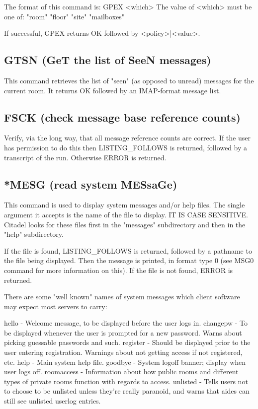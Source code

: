  The format of this command is:  GPEX <which>
 The value of <which> must be one of: "room" "floor" "site" "mailboxes"

 If successful, GPEX returns OK followed by <policy>|<value>.



\subsection{GTSN (GeT the list of SeeN messages)}

 This command retrieves the list of "seen" (as opposed to unread) messages for
the current room.  It returns OK followed by an IMAP-format message list.



\subsection{FSCK (check message base reference counts)}

 Verify, via the long way, that all message reference counts are correct.  If
the user has permission to do this then LISTING_FOLLOWS is returned, followed
by a transcript of the run.  Otherwise ERROR is returned.



\subsection{*MESG (read system MESsaGe)}

 This command is used to display system messages and/or help files.  The
single argument it accepts is the name of the file to display.  IT IS CASE
SENSITIVE.  Citadel looks for these files first in the "messages"
subdirectory and then in the "help" subdirectory.

 If the file is found, LISTING_FOLLOWS is returned, followed by a pathname
to the file being displayed.  Then the message is printed, in format type 0
(see MSG0 command for more information on this).  If the file is not found,
ERROR is returned.

 There are some "well known" names of system messages which client software
may expect most servers to carry:

 hello        -  Welcome message, to be displayed before the user logs in.
 changepw     -  To be displayed whenever the user is prompted for a new
                 password.  Warns about picking guessable passwords and such.
 register     -  Should be displayed prior to the user entering registration.
                 Warnings about not getting access if not registered, etc.
 help         -  Main system help file.
 goodbye      -  System logoff banner; display when user logs off.
 roomaccess   -  Information about how public rooms and different types of
                 private rooms function with regards to access.
 unlisted     -  Tells users not to choose to be unlisted unless they're
                 really paranoid, and warns that aides can still see
                 unlisted userlog entries.


